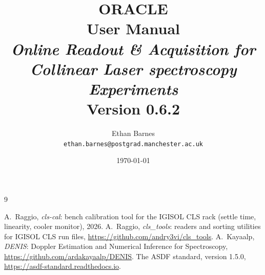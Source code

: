 \documentclass[11pt,twoside,a4paper]{article}
\title{%
    {\Huge\bfseries ORACLE}\\[2pt]
    {\large User Manual}\\[6pt]
    {\normalsize\itshape Online Readout \& Acquisition for Collinear Laser spectroscopy
     Experiments}\\[10pt]
    {\normalsize Version 0.6.2}
}
\author{Ethan Barnes \\ \texttt{ethan.barnes@postgrad.manchester.ac.uk}}
\date{\today}
\begin{document}
\maketitle
\thispagestyle{empty}
\clearpage

\tableofcontents
\clearpage











\appendix



\begin{thebibliography}{9}
 A.~Raggio, \emph{cls-cal}: bench calibration tool for the IGISOL CLS rack
    (settle time, linearity, cooler monitor), 2026.
 A.~Raggio, \emph{cls\_tools}: readers and sorting utilities for IGISOL
    CLS run files, \url{https://github.com/andry3vi/cls_tools}.
 A.~Kayaalp, \emph{DENIS}: Doppler Estimation and Numerical Inference for
    Spectroscopy, \url{https://github.com/ardakayaalp/DENIS}.
 The ASDF standard, version 1.5.0, \url{https://asdf-standard.readthedocs.io}.
\end{thebibliography}
\end{document}
